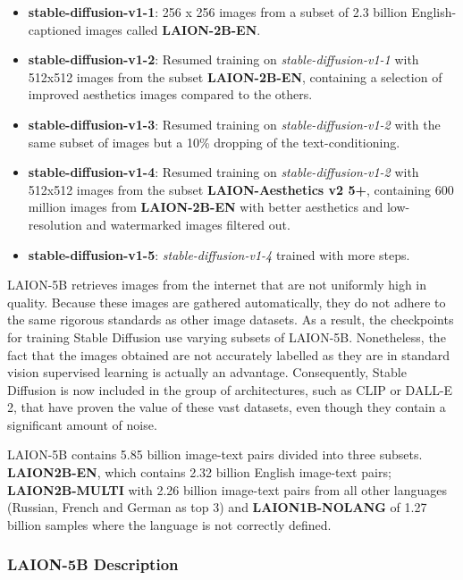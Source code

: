 \begin{itemize}
  \item \textbf{stable-diffusion-v1-1}: 256 x 256 images from a subset of 2.3 billion English-captioned images called \textbf{LAION-2B-EN}.
  \item \textbf{stable-diffusion-v1-2}: Resumed training on \textit{stable-diffusion-v1-1} with 512x512 images from the subset \textbf{LAION-2B-EN}, containing a selection of improved aesthetics images compared to the others.
  \item \textbf{stable-diffusion-v1-3}: Resumed training on \textit{stable-diffusion-v1-2} with the same subset of images but a 10\% dropping of the text-conditioning.
  \item \textbf{stable-diffusion-v1-4}: Resumed training on \textit{stable-diffusion-v1-2} with 512x512 images from the subset \textbf{LAION-Aesthetics v2 5+}, containing 600 million images from \textbf{LAION-2B-EN} with better aesthetics and low-resolution and watermarked images filtered out.
  \item \textbf{stable-diffusion-v1-5}: \textit{stable-diffusion-v1-4} trained with more steps.
\end{itemize}

LAION-5B retrieves images from the internet that are not uniformly high in quality. Because these images are gathered automatically, they do not adhere to the same rigorous standards as other image datasets. As a result, the checkpoints for training Stable Diffusion use varying subsets of LAION-5B. Nonetheless, the fact that the images obtained are not accurately labelled as they are in standard vision supervised learning is actually an advantage. Consequently, Stable Diffusion is now included in the group of architectures, such as CLIP or DALL-E 2, that have proven the value of these vast datasets, even though they contain a significant amount of noise.

LAION-5B contains 5.85 billion image-text pairs divided into three subsets. \textbf{LAION2B-EN}, which contains 2.32 billion English image-text pairs; \textbf{LAION2B-MULTI} with 2.26 billion image-text pairs from all other languages (Russian, French and German as top 3) and \textbf{LAION1B-NOLANG} of 1.27 billion samples where the language is not correctly defined. 

\subsubsection{LAION-5B Description}

